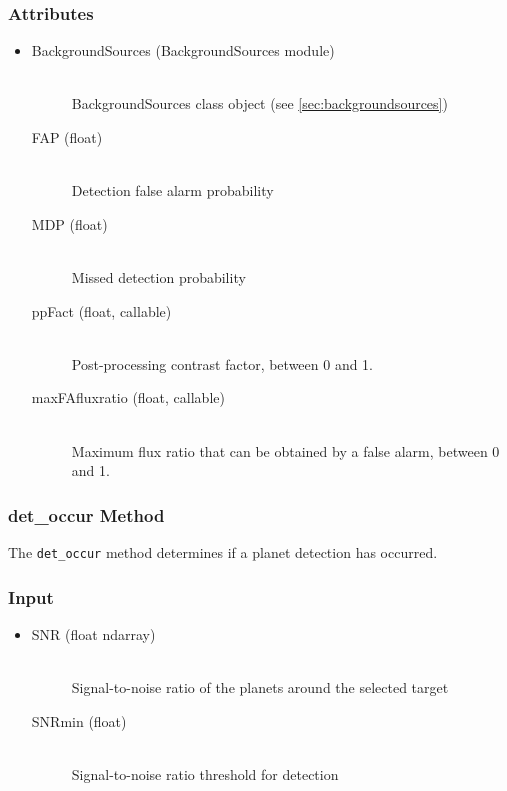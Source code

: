 \documentclass[cleanfoot]{asme2ej}
\begin{document}
\subsubsection*{Attributes}
\begin{itemize}
\item 
\begin{description}
    \item[BackgroundSources (BackgroundSources module)] \hfill \\
        BackgroundSources class object (see \ref{sec:backgroundsources})
    \item[FAP (float)] \hfill \\ Detection false alarm probability
    \item[MDP (float)] \hfill \\ Missed detection probability
    \item[ppFact (float, callable)] \hfill \\ Post-processing contrast factor, between 0 and 1.
    \item[maxFAfluxratio (float, callable)] \hfill \\ Maximum flux ratio that can be obtained by a false alarm, between 0 and 1.
\end{description}
\end{itemize}

\subsubsection{det\_occur Method} \label{sec:detoccurtask}
The \verb+det_occur+ method determines if a planet detection has occurred.

\subsubsection*{Input}
\begin{itemize}
\item 
\begin{description}
    \item[SNR (float ndarray)] \hfill \\ Signal-to-noise ratio of the planets around the selected target
    \item[SNRmin (float)] \hfill \\ Signal-to-noise ratio threshold for detection
\end{description}
\end{itemize}
\end{document}
